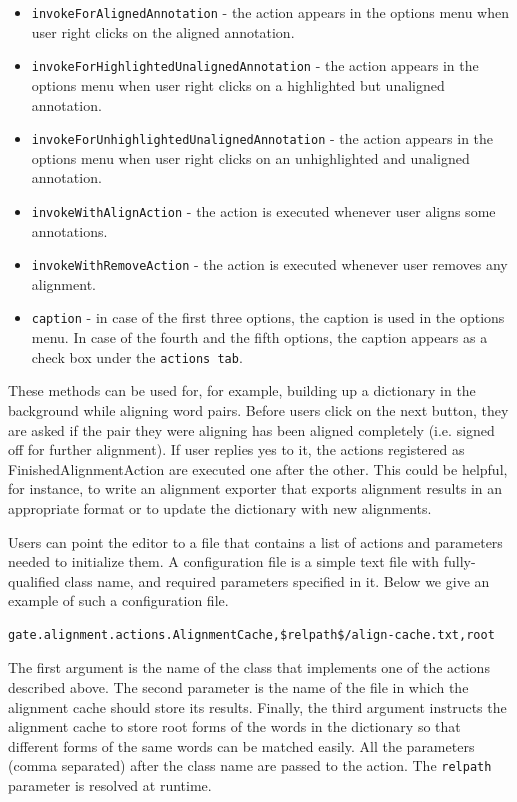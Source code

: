 \begin{itemize}
\item {\tt invokeForAlignedAnnotation} - the action appears in the options menu
when user right clicks on the aligned annotation.
\item {\tt invokeForHighlightedUnalignedAnnotation} - the action appears in the
options menu when user right clicks on a highlighted but unaligned annotation.
\item {\tt invokeForUnhighlightedUnalignedAnnotation} - the action appears in
the options menu when user right clicks on an unhighlighted and unaligned 
annotation.
\item {\tt invokeWithAlignAction} - the action is executed whenever user aligns
some annotations.
\item {\tt invokeWithRemoveAction} - the action is executed whenever user removes
any alignment.
\item {\tt caption} - in case of the first three options, the caption is used in
the options menu.  In case of the fourth and the fifth options, the caption 
appears as a check box under the {\tt actions tab}.
\end{itemize}

These methods can be used for, for example, building up a dictionary in the 
background while aligning word pairs.  Before users click on the next button, 
they are asked if the pair they were aligning has been aligned completely (i.e. 
signed off for further alignment). If user replies yes to it, the actions 
registered as FinishedAlignmentAction are executed one after the other. This 
could be helpful, for instance, to write an alignment exporter that exports 
alignment results in an appropriate format or to update the dictionary with
new alignments. 

Users can point the editor to a file that contains a list of actions and 
parameters needed to initialize them.  A configuration file is a simple text file
with fully-qualified class name, and required parameters specified in it.
Below we give an example of such a configuration file.

\begin{small}\begin{verbatim}
gate.alignment.actions.AlignmentCache,$relpath$/align-cache.txt,root
\end{verbatim}\end{small}

The first argument is the name of the class that implements one of the actions
described above.  The second parameter is the name of the file in which the
alignment cache should store its results. Finally, the third argument instructs
the alignment cache to store root forms of the words in the dictionary so that
different forms of the same words can be matched easily.  All the parameters 
(comma separated) after the class name are passed to the action. The {\tt relpath}
parameter is resolved at runtime.



